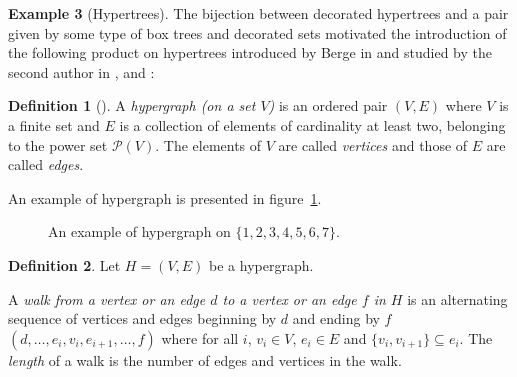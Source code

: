 \documentclass[11pt,leqno]{amsart}
\theoremstyle{definition}
\newtheorem{definition}{Definition}[subsection]
\newtheorem{example}[definition]{Example}
\theoremstyle{plain}
\begin{document}
\begin{example}[Hypertrees] \label{hypertree}
 The bijection between decorated hypertrees and a pair given by some type of box trees and decorated sets motivated the introduction of the following product on hypertrees introduced by Berge in \cite{Berge} and studied by the second author in \cite{mar1}, \cite{mar2} and \cite{mar3}:

\begin{definition}[\cite{Berge}]
		 A \emph{hypergraph (on a set $V$)} is an ordered pair $(V,E)$ where $V$ is a finite set and $E$ is a collection of elements of cardinality at least two, belonging to the power set $\mathcal{P}(V)$. The elements of $V$ are called \emph{vertices} and those of $E$ are called \emph{edges}.
		 \end{definition}
		 
		 An example of hypergraph is presented in figure~\ref{hypfig}.

		\begin{figure} 
		\centering
{}
\caption{An example of hypergraph on $\{1,2,3,4,5,6,7\}$.\label{hypfig}}
	
		\end{figure}

		\begin{definition} Let $H=(V,E)$ be a hypergraph.
		
		 A \emph{walk from a vertex or an edge $d$ to a vertex or an edge $f$ in $H$} is an alternating sequence of vertices and edges beginning by $d$ and ending by $f$ $(d, \ldots, e_i, v_i, e_{i+1}, \ldots, f)$ where for all $i$, $v_i \in V$, $e_i \in E$ and $\{v_i,v_{i+1}\} \subseteq e_i$. The \textit{length} of a walk is the number of edges and vertices in the walk.
		\end{definition}
		

\end{example}
\end{document}
